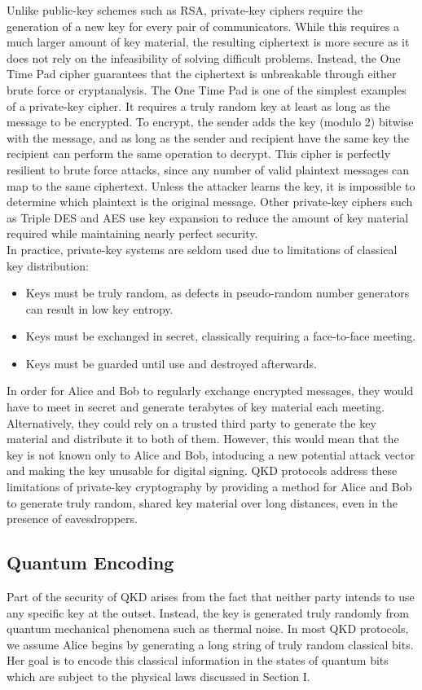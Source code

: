 \documentclass[conference]{IEEEtran}
\begin{document}
Unlike public-key schemes such as RSA, private-key ciphers require the generation of a new key for every pair of communicators. While this requires a much larger amount of key material, the resulting ciphertext is more secure as it does not rely on the infeasibility of solving difficult problems. Instead, the One Time Pad cipher guarantees that the ciphertext is unbreakable through either brute force or cryptanalysis. The One Time Pad is one of the simplest examples of a private-key cipher. It requires a truly random key at least as long as the message to be encrypted. To encrypt, the sender adds the key (modulo 2) bitwise with the message, and as long as the sender and recipient have the same key the recipient can perform the same operation to decrypt. This cipher is perfectly resilient to brute force attacks, since any number of valid plaintext messages can map to the same ciphertext. Unless the attacker learns the key, it is impossible to determine which plaintext is the original message. Other private-key ciphers such as Triple DES and AES use key expansion to reduce the amount of key material required while maintaining nearly perfect security.\\

In practice, private-key systems are seldom used due to limitations of classical key distribution:
\begin{itemize}
\item Keys must be truly random, as defects in pseudo-random number generators can result in low key entropy\cite{Heninger}.
\item Keys must be exchanged in secret, classically requiring a face-to-face meeting.
\item Keys must be guarded until use and destroyed afterwards.
\end{itemize}
In order for Alice and Bob to regularly exchange encrypted messages, they would have to meet in secret and generate terabytes of key material each meeting. Alternatively, they could rely on a trusted third party to generate the key material and distribute it to both of them. However, this would mean that the key is not known only to Alice and Bob, intoducing a new potential attack vector and making the key unusable for digital signing. QKD protocols address these limitations of private-key cryptography by providing a method for Alice and Bob to generate truly random, shared key material over long distances, even in the presence of eavesdroppers.\\

\subsection{Quantum Encoding}
Part of the security of QKD arises from the fact that neither party intends to use any specific key at the outset. Instead, the key is generated truly randomly from quantum mechanical phenomena such as thermal noise\cite{Jun}. In most QKD protocols, we assume Alice begins by generating a long string of truly random classical bits. Her goal is to encode this classical information in the states of quantum bits which are subject to the physical laws discussed in Section I.
\end{document}
